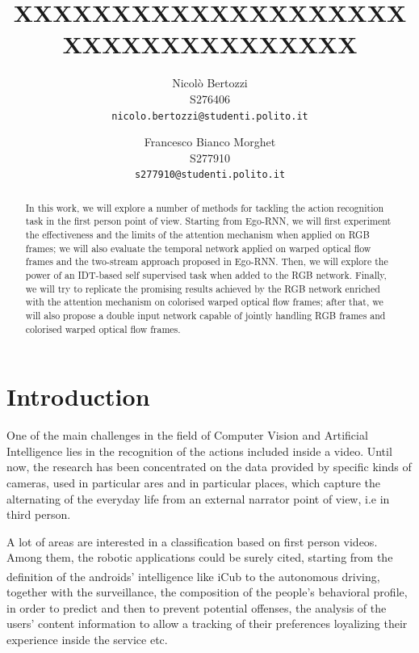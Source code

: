 \documentclass[10pt,twocolumn,letterpaper]{article}
\begin{document}
\title{XXXXXXXXXXXXXXXXXXXXXXXXXXXXXXXXXXX}

\author{Nicolò Bertozzi\\
S276406\\
{\tt\small nicolo.bertozzi@studenti.polito.it}
\and
Francesco Bianco Morghet\\
S277910\\
{\tt\small s277910@studenti.polito.it}
}

\maketitle


\begin{abstract}
	In this work, we will explore a number of methods for tackling the action recognition task in the first person point of view. Starting from Ego-RNN, we will first experiment the effectiveness and the limits of the attention mechanism when applied on RGB frames; we will also evaluate the temporal network applied on warped optical flow frames and the two-stream approach proposed in Ego-RNN. Then, we will explore the power of an IDT-based self supervised task when added to the RGB network. Finally, we will try to replicate the promising results achieved by the RGB network enriched with the attention mechanism on colorised warped optical flow frames; after that, we will also propose a double input network capable of jointly handling RGB frames and colorised warped optical flow frames.
\end{abstract}


\section{Introduction}

One of the main challenges in the field of Computer Vision and Artificial Intelligence lies in the recognition of the actions included inside a video. Until now, the research has been concentrated on the data provided by specific kinds of cameras, used in particular ares and in particular places, which capture the alternating of the everyday life from an external narrator point of view, i.e in third person.

A lot of areas are interested in a classification based on first person videos. Among them, the robotic applications could be surely cited, starting from the definition of the androids’ intelligence like iCub\textsuperscript{\textcopyright} to the autonomous driving, together with the surveillance, the composition of the people’s behavioral profile, in order to predict and then to prevent potential offenses, the analysis of the users’ content information to allow a tracking of their preferences loyalizing their experience inside the service etc.
\end{document}
